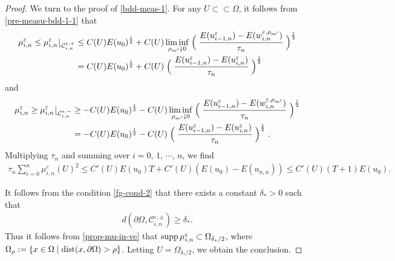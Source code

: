\documentclass[12pt]{amsart}
\begin{document}
\begin{proof}
We turn to the proof of \eqref{bdd-meas-1}. 
For any $U \subset \subset \Omega$, it follows from \eqref{pre-measu-bdd-1-1} that 
\begin{align*}
\mu^{\varepsilon}_{i,n} \le \mu^{\varepsilon}_{i,n} \lfloor_{{\mathcal{C}}^{{\varepsilon},+}_{i,n}} 
& \le C(U) E(u_0)^{\frac{1}{2}} 
      + C(U) \liminf_{\rho_{m'} \downarrow 0} \Bigm( \dfrac{E(u^{\varepsilon}_{i-1,n}) - E(w^{{\varepsilon}, \rho_{m'}}_{i,n})}{\tau_n} \Bigm)^{\frac{1}{2}} \\
& = C(U) E(u_0)^{\frac{1}{2}} 
      + C(U) \Bigm( \dfrac{E(u^{\varepsilon}_{i-1,n}) - E(u^{\varepsilon}_{i,n})}{\tau_n} \Bigm)^{\frac{1}{2}}
\end{align*}
and 
\begin{align*}
\mu^{\varepsilon}_{i,n} \ge \mu^{\varepsilon}_{i,n} \lfloor_{{\mathcal{C}}^{{\varepsilon},-}_{i,n}} 
& \ge -C(U) E(u_0)^{\frac{1}{2}} 
      - C(U) \liminf_{\rho_{m'} \downarrow 0} \Bigm( \dfrac{E(u^{\varepsilon}_{i-1,n}) - E(w^{{\varepsilon}, \rho_{m'}}_{i,n})}{\tau_n} \Bigm)^{\frac{1}{2}} \\
& = -C(U) E(u_0)^{\frac{1}{2}} 
      - C(U) \Bigm( \dfrac{E(u^{\varepsilon}_{i-1,n}) - E(u^{\varepsilon}_{i,n})}{\tau_n} \Bigm)^{\frac{1}{2}}. 
\end{align*}
Multiplying $\tau_n$ and summing over $i=0$, $1$, $\cdots$, $n$, we find 
\begin{align} \label{pre-mu-in-ve-bdd}
\tau_n \sum^{n}_{i=0} \mu^{\varepsilon}_{i,n}(U)^2 \le C'(U) E(u_0) T + C'(U) (E(u_0) - E(u_{n,n})) \le C'(U)(T+1)E(u_0).  
\end{align}

It follows from the condition \eqref{fg-cond-2} that there exists a constant ${\delta}_*>0$ such that 
\begin{align*} 
d({\partial} \Omega, {\mathcal{C}}^{{\varepsilon},\pm}_{i,n}) \ge {\delta}_*. 
\end{align*}
Thus it follows from \eqref{prop-mu-in-ve} that ${\rm supp}\, \mu^{\varepsilon}_{i,n} \subset \Omega_{{\delta}_{*}/2}$, where 
$\Omega_{\rho}:= \{ x \in \Omega \mid {\rm dist}(x, {\partial} \Omega) > \rho \}$. 
Letting $U= \Omega_{{\delta}_{*}/2}$, we obtain the conclusion. 
\end{proof}
\end{document}
